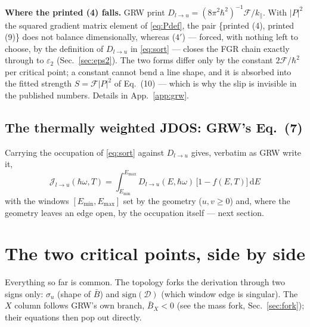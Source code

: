 \documentclass[11pt,a4paper]{article}
\numberwithin{equation}{section}
\newcommand{\hw}{\hbar\omega}
\newcommand{\cD}{\mathcal{D}}
\newcommand{\cF}{\mathcal{F}}
\newcommand{\cJ}{\mathcal{J}}
\newcommand{\Bb}{\bar{B}}
\newcommand{\kpar}{k_{\parallel}}
\newcommand{\eps}{\varepsilon}
\newcommand{\dd}{\mathrm{d}}
\newcommand{\Dlu}{D_{l\to u}}
\newcommand{\fFD}{f}
\begin{document}
\medskip
\noindent\textbf{Where the printed (4) falls.}  GRW print
$\Dlu=(8\pi^2\hbar^2)^{-1}\cF/\kpar$.  With $|P|^2$ the squared
gradient matrix element of \eqref{eq:Pdef}, the pair \{printed (4),
printed (9)\} does not balance dimensionally, whereas ($4'$) ---
forced, with nothing left to choose, by the definition of $\Dlu$ in
\eqref{eq:sort} --- closes the FGR chain exactly through to $\eps_2$
(Sec.~\ref{sec:eps2}).  The two forms differ only by the constant
$2\cF/\hbar^2$ per critical point; a constant cannot bend a line
shape, and it is absorbed into the fitted strength $S=\cF|P|^2$ of
Eq.~(10) --- which is why the slip is invisible in the published
numbers.  Details in App.~\ref{app:grw}.

\subsection{The thermally weighted JDOS: GRW's Eq.\ (7)}

Carrying the occupation of \eqref{eq:sort} against $\Dlu$ gives,
verbatim as GRW write it,
\begin{equation}
\boxed{\;
\cJ_{l\to u}(\hw,T)=\int_{E_{\min}}^{E_{\max}}
\Dlu(E,\hw)\,\bigl[1-\fFD(E,T)\bigr]\,\dd E
\;}
\tag{7}
\label{eq:J7}
\end{equation}
with the windows $[E_{\min},E_{\max}]$ set by the geometry
($u,v\ge0$) and, where the geometry leaves an edge open, by the
occupation itself --- next section.

\section{The two critical points, side by side}\label{sec:XL}

Everything so far is common.  The topology forks the derivation
through two signs only: $\sigma_u$ (shape of $\Bb$) and
$\mathrm{sign}(\cD)$ (which window edge is singular).  The $X$ column
follows GRW's own branch, $\Bb_X<0$ (see the mass fork,
Sec.~\ref{sec:fork}); their equations then pop out directly.
\end{document}
